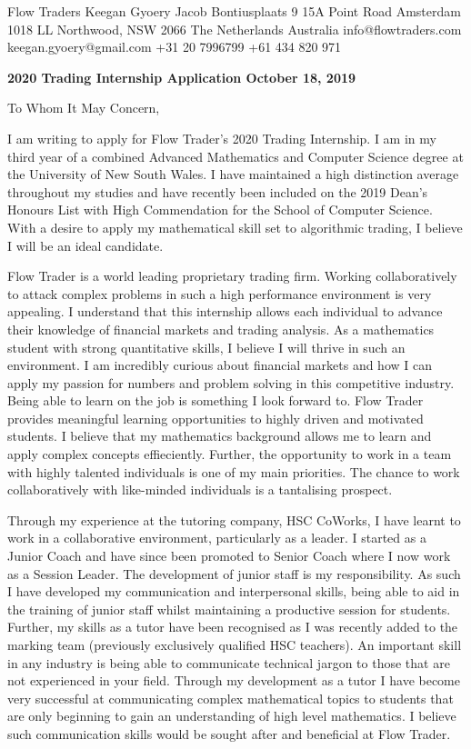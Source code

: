 \documentclass[a4paper,11pt]{article}
\begin{document}
Flow Traders \hfill Keegan Gyoery \break
Jacob Bontiusplaats 9 \hfill 15A Point Road \break
Amsterdam 1018 LL \hfill Northwood, NSW 2066 \break
The Netherlands \hfill Australia \break
info@flowtraders.com \hfill keegan.gyoery@gmail.com \break
+31 20 7996799 \hfill +61 434 820 971 \break

\vspace{5mm}
\textbf{2020 Trading Internship Application October 18, 2019} \par
To Whom It May Concern, \par

I am writing to apply for Flow Trader’s 2020 Trading Internship. I am in my third year of a
combined Advanced Mathematics and Computer Science degree at the University of New South
Wales. I have maintained a high distinction average throughout my studies and have recently been
included on the 2019 Dean’s Honours List with High Commendation for the School of Computer
Science. With a desire to apply my mathematical skill set to algorithmic trading, I believe I will
be an ideal candidate.\par

Flow Trader is a world leading proprietary trading firm. Working collaboratively to attack complex problems in such a high performance environment is very appealing. I understand that this internship allows each individual to advance their knowledge of financial markets and trading analysis. As a mathematics student with strong quantitative skills, I believe I will thrive in such an environment. I am incredibly curious about financial markets and how I can apply my passion for numbers and problem solving in this competitive industry. Being able to learn on the job is something I look forward to. Flow Trader provides meaningful learning opportunities to highly driven and motivated students. I believe that my mathematics background allows me to learn and apply complex concepts effieciently. Further, the opportunity to work in a team with highly talented individuals is one of my main priorities. The chance to work collaboratively with like-minded individuals is a tantalising prospect.

Through my experience at the tutoring company, HSC CoWorks, I have learnt to work in a collaborative environment, particularly as a leader. I started as a Junior Coach and have since been promoted to Senior Coach where I now work as a Session Leader. The development of junior staff is my responsibility. As such I have developed my communication and interpersonal skills, being able to aid in the training of junior staff whilst maintaining a productive session for students. Further, my skills as a tutor have been recognised as I was recently added to the marking team (previously exclusively qualified HSC teachers). An important skill in any industry is being able to communicate technical jargon to those that are not experienced in your field. Through my development as a tutor I have become very successful at communicating complex mathematical topics to students that are only beginning to gain an understanding of high level mathematics. I believe such communication skills would be sought after and beneficial at Flow Trader.\par
\end{document}
